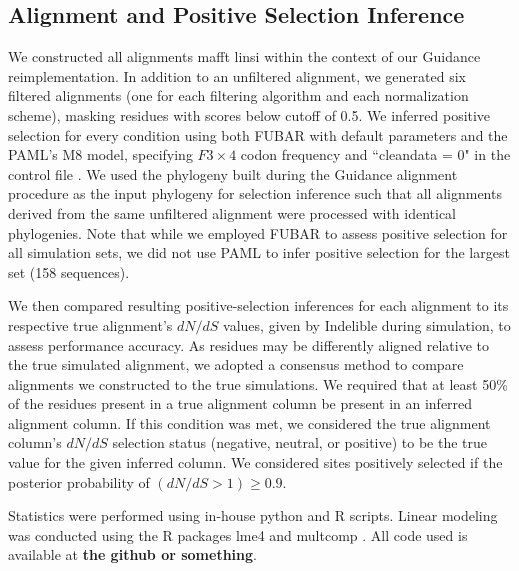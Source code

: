 \documentclass[10pt]{article}
\begin{document}
\subsection*{Alignment and Positive Selection Inference}
We constructed all alignments mafft linsi \citep{Katoh2002,Katoh2005} within the context of our Guidance reimplementation. In addition to an unfiltered alignment, we generated six filtered alignments (one for each filtering algorithm and each normalization scheme), masking residues with scores below cutoff of 0.5. We inferred positive selection for every condition using both FUBAR \citep{Murrell2013} with default parameters and the PAML's M8 model, specifying $F3\times4$ codon frequency and ``cleandata = 0" in the control file \citep{Yang2007}. We used the phylogeny built during the Guidance alignment procedure as the input phylogeny for selection inference such that all alignments derived from the same unfiltered alignment were processed with identical phylogenies. Note that while we employed FUBAR to assess positive selection for all simulation sets, we did not use PAML to infer positive selection for the largest set (158 sequences).

We then compared resulting positive-selection inferences for each alignment to its respective true alignment's $dN/dS$ values, given by Indelible during simulation, to assess performance accuracy. As residues may be differently aligned relative to the true simulated alignment, we adopted a consensus method to compare alignments we constructed to the true simulations. We required that at least 50\% of the residues present in a true alignment column be present in an inferred alignment column. If this condition was met, we considered the true alignment column’s $dN/dS$  selection status (negative, neutral, or positive) to be the true value for the given inferred column. We considered sites positively selected if the posterior probability of $(dN/dS>1) \geq 0.9$.

Statistics were performed using in-house python and R scripts. Linear modeling was conducted using the R packages lme4 \citep{Bates2012} and
multcomp \citep{Hothorn2008}. All code used is available at \textbf{the github or something}.
\end{document}
